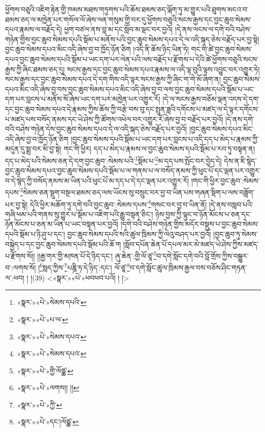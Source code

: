 ཕྱོགས་བཅུའི་འཇིག་རྟེན་གྱི་ཁམས་མཐས་གཏུགས་པའི་ཆོས་ཐམས་ཅད་ལྐོག་ཏུ་མ་གྱུར་པའི་ཐུགས་མངའ་བ་ཐམས་ཅད་ལ་མཁྱེན་པར་གསོལ་ལོ་ཞེས་ལན་གསུམ་གྱི་བར་དུ་ཕྱོགས་བཅུའི་སངས་རྒྱས་དང་བྱང་ཆུབ་སེམས་དཔའ་རྣམས་ལ་བརྗོད་དེ། ཕྱག་བཙལ་ནས་བླ་མ་དང་སློབ་མ་ལྡང་བར་བྱའོ། །དེ་ནས་ལངས་ལ་དགེ་བའི་བཤེས་གཉེན་གྱིས་བྱང་ཆུབ་སེམས་དཔའི་སྡོམ་པ་མནོས་པའི་བྱང་ཆུབ་སེམས་དཔའ་དེ་ལ་འདི་སྐད་ཅེས་བརྗོད་པར་བྱ་སྟེ། བྱང་ཆུབ་སེམས་དཔའ་མིང་འདི་ཞེས་བྱ་བ་ཁྱོད་ཉོན་ཅིག །འདི་ནི་ཆོས་ཉིད་ཡིན་ཏེ། གང་གི་ཚེ་བྱང་ཆུབ་སེམས་དཔའ་བྱང་ཆུབ་སེམས་དཔའི་སྡོམ་པ་ཡང་དག་པར་ལེན་པའི་ལས་བརྗོད་པ་རྫོགས་པ་དེའི་ཚེ་ཕྱོགས་བཅུའི་སངས་རྒྱས་ཀྱི་ཞིང་ཐམས་ཅད་དུ། སངས་རྒྱས་དང་བྱང་ཆུབ་སེམས་དཔའ་རྣམས་ལ་འདི་ལྟ་བུའི་ལྟས་འབྱུང་བར་འགྱུར་ཏེ། སངས་རྒྱས་དང་བྱང་ཆུབ་སེམས་དཔའ་དེ་དག་གིས་འདི་ལྟར་སངས་རྒྱས་ཀྱི་ཞིང་ག་གེ་མོ་ཞིག་ན། བྱང་ཆུབ་སེམས་དཔའ་མིང་འདི་ཞེས་བྱ་བས་བྱང་ཆུབ་སེམས་དཔའ་མིང་འདི་ཞེས་བྱ་བ་ལས་བྱང་ཆུབ་སེམས་དཔའི་སྡོམ་པ་ཡང་དག་པར་བླངས་པ་མནོས་སོ་ཞེས་ཡང་དག་པར་མཁྱེན་པར་འགྱུར་རོ། །དེ་ལ་སངས་རྒྱས་བཅོམ་ལྡན་འདས་དེ་དག་དང་བྱང་ཆུབ་སེམས་དཔའ་དེ་རྣམས་ཀྱིས་ཆོས་ཀྱི་བརྩེ་བས་བུ་དང་སྤུན་ཟླའི་དགོངས་པ་མཛད་ལ་དེ་ལྟར་དགོངས་པ་མཛད་པས་བསོད་ནམས་དང་ཡེ་ཤེས་ཀྱི་ཚོགས་འཕེལ་བར་འགྱུར་རོ་ཞེས་བྱ་བ་བརྗོད་པར་བྱའོ། །དེ་ནས་དགེ་བའི་བཤེས་གཉེན་དེས་བྱང་ཆུབ་སེམས་དཔའ་དེ་ལ་འདི་སྐད་ཅེས་བརྗོད་པར་བྱའོ། །བྱང་ཆུབ་སེམས་དཔའ་མིང་འདི་ཞེས་བྱ་བ་ཁྱོད་ཉོན་ཅིག །བྱང་ཆུབ་སེམས་དཔའི་སྡོམ་པ་ཡང་དག་པར་བླངས་པ་འདི་དད་པ་མེད་པ་རྣམས་ཀྱི་མདུན་དུ་སྨྲ་བར་མི་བྱ་སྟེ། གང་གི་ཕྱིར། དད་པ་མེད་པ་རྣམས་ལ་བྱང་ཆུབ་སེམས་དཔའི་སྡོམ་པ་རབ་ཏུ་བསྟན་ན། དད་པ་མེད་པའི་སེམས་ཅན་དེ་དག་བྱང་ཆུབ་:སེམས་པའི་\footnote{«སྣར་»«པེ་»སེམས་དཔའི་}སྡོམ་པ་\footnote{«སྣར་»«པེ་»པ་ལ་}མ་དད་པས་སྤོང་བར་བྱེད་དེ། དེས་ན་ཇི་སྙེད་བྱང་ཆུབ་སེམས་དཔའ་བྱང་ཆུབ་སེམས་དཔའི་སྡོམ་པ་ལ་གནས་པ་ལ་བསོད་ནམས་ཀྱི་ཕུང་པོ་དང་ལྡན་པར་འགྱུར་བ་དེ་སྙེད་ཀྱི་བསོད་ནམས་མ་ཡིན་པའི་ཕུང་པོ་མ་དད་པ་དེ་དང་ལྡན་པར་འགྱུར་རོ། །གང་གི་ཕྱིར་བྱང་ཆུབ་:སེམས་དཔས་\footnote{«སྣར་»«པེ་»སེམས་དཔའ་}སེམས་ཅན་སྡུག་བསྔལ་ཐམས་ཅད་ལས་ཡོངས་སུ་བསྲུང་བར་བྱ་བ་ཡིན་པས་གཞན་སྡིག་པ་ལས་བཟློག་པར་བྱ་སྟེ། དེའི་ཕྱིར་མཆོག་ཏུ་དགེ་བའི་བྱང་ཆུབ་:སེམས་དཔས་\footnote{«སྣར་»«པེ་»སེམས་དཔའ་}གསང་བར་བྱ་བ་ཡིན་ནོ། །དེ་ནས་བསླབ་པའི་གཞི་ཕམ་པའི་གནས་སུ་གྱུར་པ་སྡོམ་པ་འཇིག་པའི་རྒྱུ་བསྟན་ཅིང་། ཉེས་བྱས་ཀྱི་ལྟུང་བ་ཉོན་མོངས་པ་ཅན་དང་ཉོན་མོངས་པ་ཅན་མ་ཡིན་པ་ཡང་བསྟན་པར་བྱའོ། །དགེ་བའི་བཤེས་གཉེན་གྱིས་མདོར་བསྡུས་པ་བྱང་ཆུབ་སེམས་དཔའི་སྡོམ་པ་ཉི་ཤུ་པ་དང་། བྱང་ཆུབ་སེམས་དཔའི་སའི་ཚུལ་ཁྲིམས་ཀྱི་ལེའུ་བཤད་པར་བྱའོ། །བྱང་ཆུབ་ཏུ་སེམས་བསྐྱེད་པ་དང་བྱང་ཆུབ་སེམས་དཔའི་སྡོམ་པའི་ཆོ་ག །སློབ་དཔོན་ཆེན་པོ་དཔལ་མར་མེ་མཛད་ཡེ་ཤེས་ཀྱིས་མཛད་པ་རྫོགས་སོ།། །།རྒྱ་གར་གྱི་མཁན་པོ་དེ་ཉིད་དང་། ཞུ་ཆེན་:གྱི་ལོ་ཙཱ་\footnote{«སྣར་»«པེ་»གྱི་ལོཙྪ་}བ་དགེ་སློང་དགེ་བའི་བློ་གྲོས་ཀྱིས་བསྒྱུར་བ་:ལགས་སོ། །\footnote{«སྣར་»«པེ་»ལགས།། །།}སླད་ཀྱིས་\footnote{«སྣར་»«པེ་»ཀྱི་}པཎྜི་ཏ་དེ་ཉིད་:དང་། ལོ་ཙཱ་\footnote{«སྣར་»«པེ་»དང་།ལོཙྪ་}བ་དགེ་སློང་ཚུལ་ཁྲིམས་རྒྱལ་བས་བཅོས་ཤིང་གཏན་ལ་:ཕབ། ། །(39) <«སྣར་»«པེ་»ཕབཕབ་པའོ། །
 །>